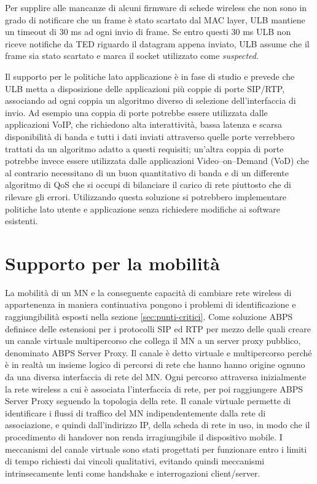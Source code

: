 \documentclass[12pt,a4paper,openright,twoside,draft]{book}
\begin{document}
Per supplire alle mancanze di alcuni firmware di schede wireless che
non sono in grado di notificare che un frame è stato scartato dal MAC
layer, ULB mantiene un timeout di 30 ms ad ogni invio di frame. Se
entro questi 30 ms ULB non riceve notifiche da TED riguardo il
datagram appena inviato, ULB assume che il frame sia stato scartato e
marca il socket utilizzato come \emph{suspected}.

Il supporto per le politiche lato applicazione è in fase di studio e
prevede che ULB metta a disposizione delle applicazioni più coppie di
porte SIP/RTP, associando ad ogni coppia un algoritmo diverso di
selezione dell'interfaccia di invio. Ad esempio una coppia di porte
potrebbe essere utilizzata dalle applicazioni VoIP, che richiedono
alta interattività, bassa latenza e scarsa disponibilità di banda e
tutti i dati inviati attraverso quelle porte verrebbero trattati da un
algoritmo adatto a questi requisiti; un'altra coppia di porte potrebbe
invece essere utilizzata dalle applicazioni Video--on--Demand (VoD)
che al contrario necessitano di un buon quantitativo di banda e di un
differente algoritmo di QoS che si occupi di bilanciare il carico di
rete piuttosto che di rilevare gli errori. Utilizzando questa
soluzione si potrebbero implementare politiche lato utente e
applicazione senza richiedere modifiche ai software esistenti.

\section{Supporto per la mobilità}

La mobilità di un MN e la conseguente capacità di cambiare rete
wireless di appartenenza in maniera continuativa pongono i problemi di
identificazione e raggiungibilità esposti nella sezione
\ref{sec:punti-critici}. Come soluzione ABPS definisce delle
estensioni per i protocolli SIP ed RTP per mezzo delle quali creare un
canale virtuale multipercorso che collega il MN a un server proxy
pubblico, denominato ABPS Server Proxy. Il canale è detto virtuale e
multipercorso perché è in realtà un insieme logico di percorsi di rete
che hanno hanno origine ognuno da una diversa interfaccia di rete del
MN. Ogni percorso attraversa inizialmente la rete wireless a cui è
associata l'interfaccia di rete, per poi raggiungere ABPS Server Proxy
seguendo la topologia della rete. Il canale virtuale permette di
identificare i flussi di traffico del MN indipendentemente dalla rete
di associazione, e quindi dall'indirizzo IP, della scheda di rete in
uso, in modo che il procedimento di handover non renda irragiungibile
il dispositivo mobile. I meccanismi del canale virtuale sono stati
progettati per funzionare entro i limiti di tempo richiesti dai
vincoli qualitativi, evitando quindi meccanismi intrinsecamente lenti
come handshake e interrogazioni client/server.
\end{document}
